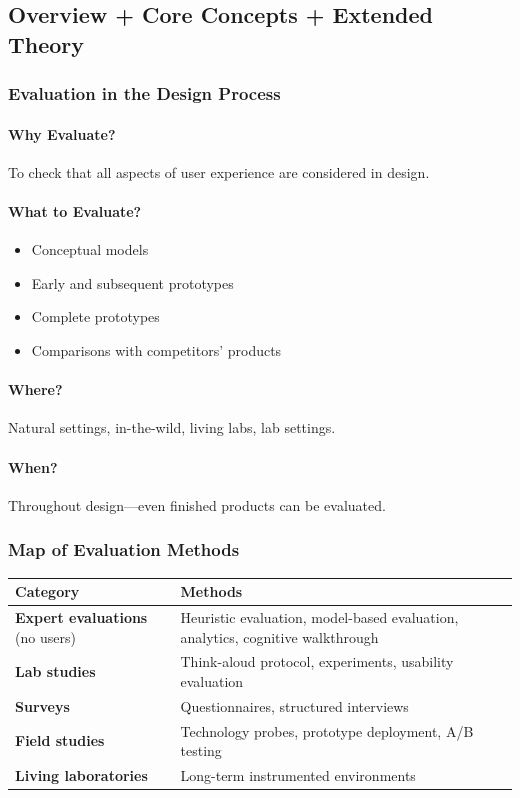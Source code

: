 \subsection{Overview + Core Concepts + Extended Theory}

\subsubsection*{Evaluation in the Design Process}

\paragraph*{Why Evaluate?}
To check that all aspects of user experience are considered in design.

\paragraph*{What to Evaluate?}
\begin{itemize}
  \item Conceptual models
  \item Early and subsequent prototypes
  \item Complete prototypes
  \item Comparisons with competitors' products
\end{itemize}

\paragraph*{Where?}
Natural settings, in-the-wild, living labs, lab settings.

\paragraph*{When?}
Throughout design---even finished products can be evaluated.

\subsubsection*{Map of Evaluation Methods}

\begin{center}
\renewcommand{\arraystretch}{1.3}
\begin{tabular}{@{} l p{9cm} @{}}
\toprule
\textbf{Category} & \textbf{Methods} \\
\midrule
\textbf{Expert evaluations} (no users) & Heuristic evaluation, model-based evaluation, analytics, cognitive walkthrough \\
\textbf{Lab studies} & Think-aloud protocol, experiments, usability evaluation \\
\textbf{Surveys} & Questionnaires, structured interviews \\
\textbf{Field studies} & Technology probes, prototype deployment, A/B testing \\
\textbf{Living laboratories} & Long-term instrumented environments \\
\bottomrule
\end{tabular}
\end{center}

